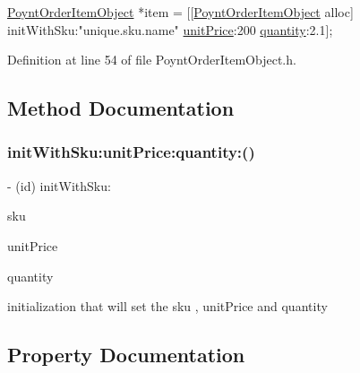 \begin{DoxyCode}
\hyperlink{interface_poynt_order_item_object}{PoyntOrderItemObject} *item  = [[\hyperlink{interface_poynt_order_item_object}{PoyntOrderItemObject} alloc] 
      initWithSku:\textcolor{stringliteral}{"unique.sku.name"} \hyperlink{interface_poynt_order_item_object_a4655acbe158688f583828a9a3b61a6aa}{unitPrice}:200 \hyperlink{interface_poynt_order_item_object_ab39715c10682638e342e25893caa7372}{quantity}:2.1];
\end{DoxyCode}
 

Definition at line 54 of file Poynt\+Order\+Item\+Object.\+h.



\subsection{Method Documentation}
\hypertarget{interface_poynt_order_item_object_a9af033018e30ae4ea14b2425c449e443}{}\label{interface_poynt_order_item_object_a9af033018e30ae4ea14b2425c449e443} 
\subsubsection{\texorpdfstring{init\+With\+Sku\+:unit\+Price\+:quantity\+:()}{initWithSku:unitPrice:quantity:()}}
{\footnotesize\ttfamily -\/ (id) init\+With\+Sku\+: \begin{DoxyParamCaption}\item[{(N\+S\+String $\ast$)}]{sku }\item[{unitPrice:(N\+S\+Integer)}]{unit\+Price }\item[{quantity:(float)}]{quantity }\end{DoxyParamCaption}}



initialization that will set the sku , unit\+Price and quantity 



\subsection{Property Documentation}
\hypertarget{interface_poynt_order_item_object_a1748706da6a2d9e7513e0075dadfc348}{}\label{interface_poynt_order_item_object_a1748706da6a2d9e7513e0075dadfc348} 
